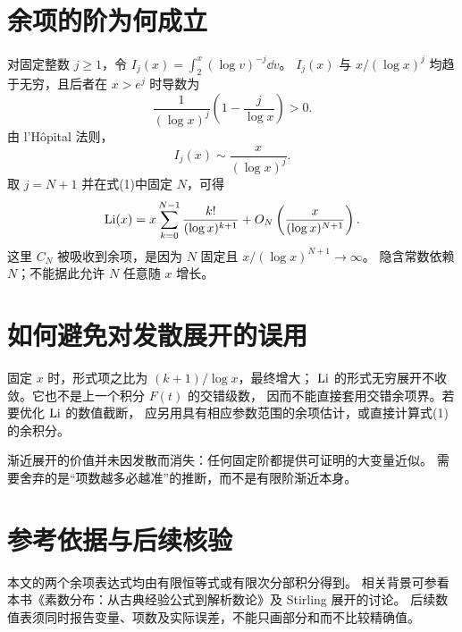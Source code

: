 \documentclass[UTF8,fontset=fandol,11pt]{ctexart}
\begin{document}
\section{余项的阶为何成立}
对固定整数 $j\ge1$，令 $I_j(x)=\int_2^x(\log v)^{-j}\dd v$。
$I_j(x)$ 与 $x/(\log x)^j$ 均趋于无穷，且后者在 $x>e^j$ 时导数为
\[
 \frac1{(\log x)^j}\left(1-\frac j{\log x}\right)>0.
\]
由 l'Hôpital 法则，
\[
 I_j(x)\sim \frac{x}{(\log x)^j}.
\]
取 $j=N+1$ 并在式(1)中固定 $N$，可得
\[
 \operatorname{Li}(x)=x\sum_{k=0}^{N-1}\frac{k!}{(\log x)^{k+1}}
       +O_N\left(\frac{x}{(\log x)^{N+1}}\right).
\]
这里 $C_N$ 被吸收到余项，是因为 $N$ 固定且 $x/(\log x)^{N+1}\to\infty$。
隐含常数依赖 $N$；不能据此允许 $N$ 任意随 $x$ 增长。

\section{如何避免对发散展开的误用}
固定 $x$ 时，形式项之比为 $(k+1)/\log x$，最终增大；
$\operatorname{Li}$ 的形式无穷展开不收敛。它也不是上一个积分 $F(t)$ 的交错级数，
因而不能直接套用交错余项界。若要优化 $\operatorname{Li}$ 的数值截断，
应另用具有相应参数范围的余项估计，或直接计算式(1)的余积分。

渐近展开的价值并未因发散而消失：任何固定阶都提供可证明的大变量近似。
需要舍弃的是“项数越多必越准”的推断，而不是有限阶渐近本身。

\section*{参考依据与后续核验}
本文的两个余项表达式均由有限恒等式或有限次分部积分得到。
相关背景可参看本书《素数分布：从古典经验公式到解析数论》及 Stirling 展开的讨论。
后续数值表须同时报告变量、项数及实际误差，不能只画部分和而不比较精确值。
\end{document}
